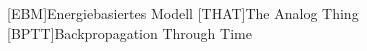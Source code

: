 
\section*{}

\begin{acronym}[WYSIWYG]\itemsep0pt
  [EBM]{Energiebasiertes Modell}
  [THAT]{The Analog Thing}
  [BPTT]{Backpropagation Through Time}
\end{acronym}
